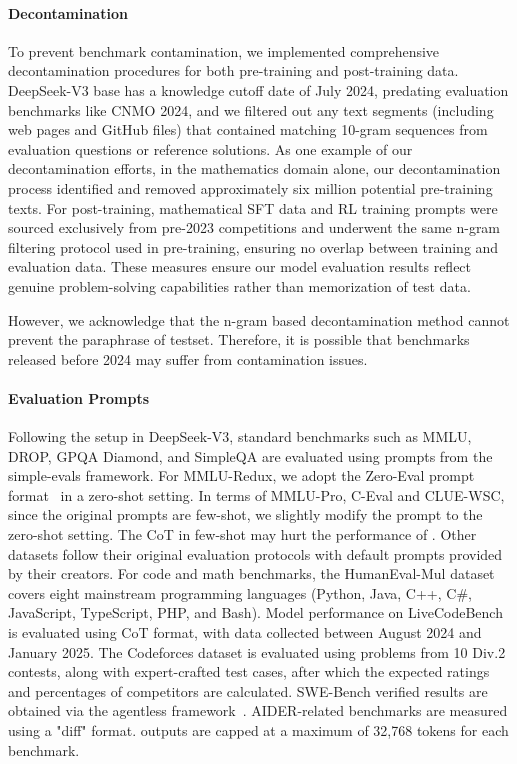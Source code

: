 \paragraph{Decontamination}\label{sec:conta}
To prevent benchmark contamination, we implemented comprehensive decontamination procedures for both pre-training and post-training data. DeepSeek-V3 base has a knowledge cutoff date of July 2024, predating evaluation benchmarks like CNMO 2024, and we filtered out any text segments (including web pages and GitHub files) that contained matching 10-gram sequences from evaluation questions or reference solutions. As one example of our decontamination efforts, in the mathematics domain alone, our decontamination process identified and removed approximately six million potential pre-training texts. For post-training, mathematical SFT data and RL training prompts were sourced exclusively from pre-2023 competitions and underwent the same n-gram filtering protocol used in pre-training, ensuring no overlap between training and evaluation data. These measures ensure our model evaluation results reflect genuine problem-solving capabilities rather than memorization of test data.

However, we acknowledge that  the n-gram based decontamination method cannot prevent the paraphrase of testset. Therefore, it is possible that benchmarks released before 2024 may suffer from contamination issues. 


\paragraph{Evaluation Prompts} Following the setup in DeepSeek-V3, standard benchmarks such as MMLU, DROP, GPQA Diamond, and SimpleQA are evaluated using prompts from the simple-evals framework. For MMLU-Redux, we adopt the Zero-Eval prompt format~\citep{Lin_ZeroEval_A_Unified_2024} in a zero-shot setting. In terms of MMLU-Pro, C-Eval and CLUE-WSC, since the original prompts are few-shot, we slightly modify the prompt to the zero-shot setting. The CoT in few-shot may hurt the performance of  \dsri{}. 
Other datasets follow their original evaluation protocols with default prompts provided by their creators. 
For code and math benchmarks, the HumanEval-Mul dataset covers eight mainstream programming languages (Python, Java, C++, C\#, JavaScript, TypeScript, PHP, and Bash). 
Model performance on LiveCodeBench is evaluated using  CoT format, with data collected between August 2024 and January 2025. The Codeforces dataset is evaluated using problems from 10 Div.2 contests, along with expert-crafted test cases, after which the expected ratings and percentages of competitors are calculated. SWE-Bench verified results are obtained via the agentless framework~\citep{agentless}. AIDER-related benchmarks are measured using a "diff" format.
\dsri{} outputs are capped at a maximum of 32,768 tokens for each benchmark.

